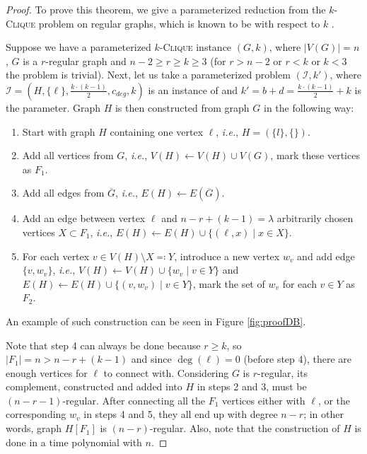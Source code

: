 \begin{proof}\label{proofDB}
    To prove this theorem, we give a parameterized reduction from the $k$-\textsc{Clique} problem on regular graphs,
    which is known to be \Wh with respect to $k$ \cite{Mathieson2008}.
    
    Suppose we have a parameterized $k$-\textsc{Clique} instance $(G, k)$, where
    $|V(G)|=n$, $G$ is a $r$-regular graph and $n-2 \geq r \geq k \geq 3$ (for $r > n-2$ or $r < k$ or $k < 3$ the problem is trivial).
    Next, let us take a parameterized problem $(\mathcal{I}, k')$, where
    $\mathcal{I} = (H, \{\ell\}, \frac{k\cdot(k-1)}{2}, c_{deg}, k)$ is an instance of \HLdeg and
    $k' = b + d = \frac{k\cdot(k-1)}{2} + k$ is the parameter.
    Graph $H$ is then constructed from graph $G$ in the following way:

    \begin{enumerate}
        \item Start with graph $H$ containing one vertex $\ell$, \emph{i.e.}, $H = (\{l\}, \{\})$.
        \item Add all vertices from $G$, \emph{i.e.}, $V(H) \leftarrow V(H) \cup V(G)$, mark these vertices as $F_1$.
        \item Add all edges from $\overline{G}$, \emph{i.e.}, $E(H) \leftarrow E(\overline{G})$.
        \item Add an edge between vertex $\ell$ and $n - r + (k - 1) = \lambda$ arbitrarily chosen vertices $X \subset F_1$,
        \emph{i.e.}, $E(H) \leftarrow E(H) \cup \{ (\ell, x) \mid x \in X \}$.
        \item For each vertex $v \in V(H) \setminus X \eqqcolon Y$, introduce a new vertex $w_v$ and add edge $\{v, w_v\}$, \emph{i.e.},
              $V(H) \leftarrow V(H) \cup \{ w_v \mid v \in Y \}$ and $E(H) \leftarrow E(H) \cup \{ (v, w_v) \mid v \in Y \}$,
              mark the set of $w_v$ for each $v \in Y$ as $F_2$.
    \end{enumerate}
    An example of such construction can be seen in Figure \ref{fig:proofDB}.

    Note that step 4 can always be done because $r \ge k$, so $|F_1| = n > n - r + (k - 1)$
    and since $\deg(\ell) = 0$ (before step 4), there are enough vertices for $\ell$ to connect with.
    Considering $G$ is $r$-regular, its complement, constructed and added into $H$ in steps 2 and 3, must be $(n-r-1)$-regular.
    After connecting all the $F_1$ vertices either with $\ell$, or the corresponding $w_v$ in steps 4 and 5,
    they all end up with degree $n-r$; in other words, graph $H[F_1]$ is $(n-r)$-regular.
    Also, note that the construction of $H$ is done in a time polynomial with $n$.


\end{proof}
